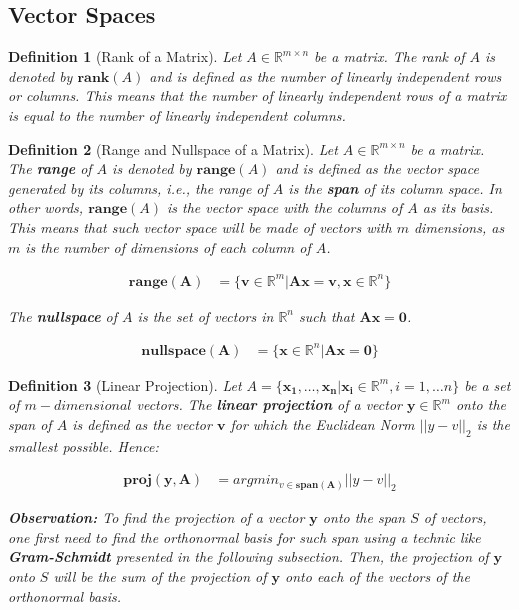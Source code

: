 \documentclass{article}
\newtheorem{definition}{Definition}[section]
\begin{document}
\subsection{Vector Spaces}

\begin{definition}[Rank of a Matrix]
	Let $A \in \mathbb{R}^{m \times n}$ be a matrix. The rank of $A$ is denoted by $\mathbf{rank}(A)$ and is defined as the number of linearly independent rows or columns. This means that the number of linearly independent rows of a matrix is equal to the number of linearly independent columns.
\end{definition}


\begin{definition}[Range and Nullspace of a Matrix]
	Let $A \in \mathbb{R}^{m \times n}$ be a matrix. The \textbf{range} of $A$ is denoted by $\mathbf{range}(A)$ and is defined as the vector space generated by its columns, i.e., the range of $A$ is the \textbf{span} of its column space. In other words, $\mathbf{range}(A)$ is the vector space with the columns of $A$ as its basis. This means that such vector space will be made of vectors with $m$ dimensions, as $m$ is the number of dimensions of each column of $A$.
	
	\begin{align}
		\mathbf{range(A)} &= \{\mathbf{v} \in \mathbb{R}^m |  \mathbf{Ax} = \mathbf{v}, \mathbf{x} \in \mathbb{R}^n\}
	\end{align}
	
	The \textbf{nullspace} of $A$ is the set of vectors in $\mathbb{R}^n$ such that $\mathbf{Ax = 0}$.
		
	\begin{align}
		\mathbf{nullspace(A)} &= \{\mathbf{x} \in \mathbb{R}^n |  \mathbf{Ax} = \mathbf{0}\}
	\end{align}
\end{definition}

\begin{definition}[Linear Projection]
	Let $A = \{\mathbf{x_1, \ldots, x_n} | \mathbf{x_i} \in \mathbb{R}^m, i = 1, \ldots n \}$ be a set of $m-dimensional$ vectors. The \textbf{linear projection} of a vector $\mathbf{y} \in \mathbb{R}^m$ onto the span of $A$ is defined as the vector $\mathbf{v}$ for which the Euclidean Norm $||y - v||_2$ is the smallest possible. Hence:
	
	\begin{align}
		\mathbf{proj(y, A)} &= argmin_{v \in \mathbf{span(A)}}||y - v||_2
	\end{align}
	
	\textbf{Observation:} To find the projection of a vector $\mathbf{y}$ onto the span $S$ of vectors, one first need to find the orthonormal basis for such span using a technic like \textbf{Gram-Schmidt} presented in the following subsection.  Then, the projection of $\mathbf{y}$ onto $S$ will be the sum of the projection of $\mathbf{y}$ onto each of the vectors of the orthonormal basis.
\end{definition}
\end{document}
